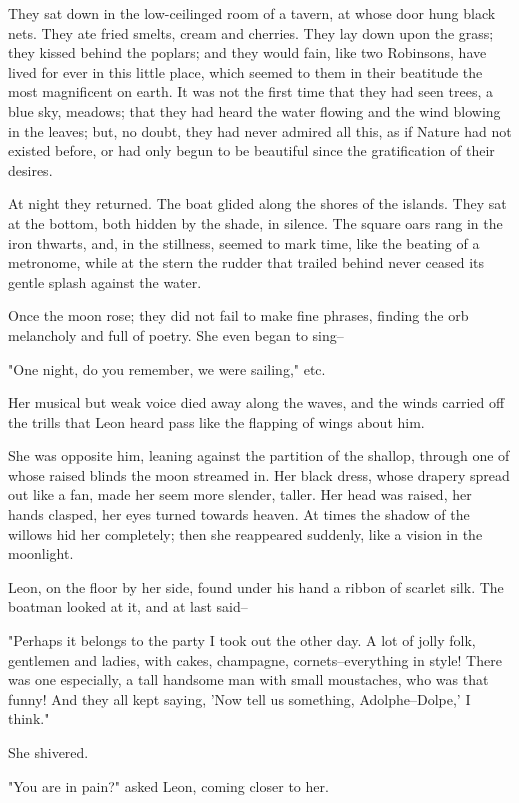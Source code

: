 \documentclass{tufte-book}
\begin{document}
They sat down in the low-ceilinged room of a tavern, at whose door hung
black nets. They ate fried smelts, cream and cherries. They lay down
upon the grass; they kissed behind the poplars; and they would fain,
like two Robinsons, have lived for ever in this little place, which
seemed to them in their beatitude the most magnificent on earth. It was
not the first time that they had seen trees, a blue sky, meadows; that
they had heard the water flowing and the wind blowing in the leaves;
but, no doubt, they had never admired all this, as if Nature had
not existed before, or had only begun to be beautiful since the
gratification of their desires.

At night they returned. The boat glided along the shores of the islands.
They sat at the bottom, both hidden by the shade, in silence. The square
oars rang in the iron thwarts, and, in the stillness, seemed to mark
time, like the beating of a metronome, while at the stern the rudder
that trailed behind never ceased its gentle splash against the water.

Once the moon rose; they did not fail to make fine phrases, finding the
orb melancholy and full of poetry. She even began to sing--

"One night, do you remember, we were sailing," etc.

Her musical but weak voice died away along the waves, and the winds
carried off the trills that Leon heard pass like the flapping of wings
about him.

She was opposite him, leaning against the partition of the shallop,
through one of whose raised blinds the moon streamed in. Her black
dress, whose drapery spread out like a fan, made her seem more slender,
taller. Her head was raised, her hands clasped, her eyes turned towards
heaven. At times the shadow of the willows hid her completely; then she
reappeared suddenly, like a vision in the moonlight.

Leon, on the floor by her side, found under his hand a ribbon of scarlet
silk. The boatman looked at it, and at last said--

"Perhaps it belongs to the party I took out the other day. A lot
of jolly folk, gentlemen and ladies, with cakes, champagne,
cornets--everything in style! There was one especially, a tall handsome
man with small moustaches, who was that funny! And they all kept saying,
'Now tell us something, Adolphe--Dolpe,' I think."

She shivered.

"You are in pain?" asked Leon, coming closer to her.
\end{document}
